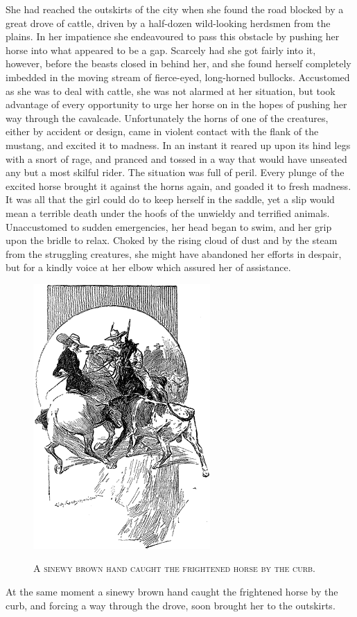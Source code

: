 \documentclass[12pt,english]{book}
\newcommand{\noun}[1]{\textsc{#1}}
\begin{document}
She had reached the outskirts of the city when she found the road
blocked by a great drove of cattle, driven by a half-dozen wild-looking
herdsmen from the plains. In her impatience she endeavoured to pass
this obstacle by pushing her horse into what appeared to be a gap.
Scarcely had she got fairly into it, however, before the beasts closed
in behind her, and she found herself completely imbedded in the moving
stream of fierce-eyed, long-horned bullocks. Accustomed as she was
to deal with cattle, she was not alarmed at her situation, but took
advantage of every opportunity to urge her horse on in the hopes of
pushing her way through the cavalcade. Unfortunately the horns of
one of the creatures, either by accident or design, came in violent
contact with the flank of the mustang, and excited it to madness.
In an instant it reared up upon its hind legs with a snort of rage,
and pranced and tossed in a way that would have unseated any but a
most skilful rider. The situation was full of peril. Every plunge
of the excited horse brought it against the horns again, and goaded
it to fresh madness. It was all that the girl could do to keep herself
in the saddle, yet a slip would mean a terrible death under the hoofs
of the unwieldy and terrified animals. Unaccustomed to sudden emergencies,
her head began to swim, and her grip upon the bridle to relax. Choked
by the rising cloud of dust and by the steam from the struggling creatures,
she might have abandoned her efforts in despair, but for a kindly
voice at her elbow which assured her of assistance. %
\begin{figure}[htbp]
\noindent \begin{center}\includegraphics{images/study10-stud-16.png}\end{center}

\noindent \begin{center}\noun{A sinewy brown hand caught the frightened
horse by the curb.}\end{center}
\end{figure}
At the same moment a sinewy brown hand caught the frightened horse
by the curb, and forcing a way through the drove, soon brought her
to the outskirts.
\end{document}
